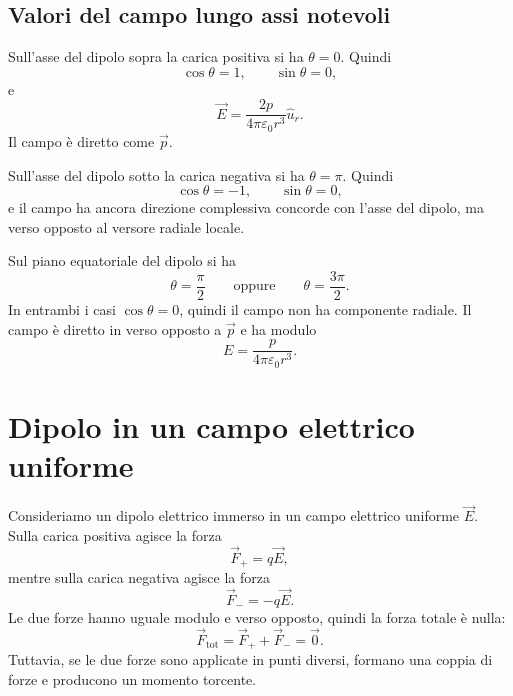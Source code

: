 \documentclass[a4paper]{article}
\begin{document}
\subsection{Valori del campo lungo assi notevoli}

Sull'asse del dipolo sopra la carica positiva si ha \(\theta=0\). Quindi
\[
    \cos\theta=1,
    \qquad
    \sin\theta=0,
\]
e
\[
    \vec{E}=\frac{2p}{4\pi\varepsilon_0r^3}\hat{u}_r.
\]
Il campo è diretto come \(\vec{p}\).

Sull'asse del dipolo sotto la carica negativa si ha \(\theta=\pi\). Quindi
\[
    \cos\theta=-1,
    \qquad
    \sin\theta=0,
\]
e il campo ha ancora direzione complessiva concorde con l'asse del dipolo, ma verso opposto al versore radiale locale.

Sul piano equatoriale del dipolo si ha
\[
    \theta=\frac{\pi}{2}
    \qquad\text{oppure}\qquad
    \theta=\frac{3\pi}{2}.
\]
In entrambi i casi \(\cos\theta=0\), quindi il campo non ha componente radiale. Il campo è diretto in verso opposto a \(\vec{p}\) e ha modulo
\[
    E=\frac{p}{4\pi\varepsilon_0r^3}.
\]

\section{Dipolo in un campo elettrico uniforme}

Consideriamo un dipolo elettrico immerso in un campo elettrico uniforme \(\vec{E}\). Sulla carica positiva agisce la forza
\[
    \vec{F}_+=q\vec{E},
\]
mentre sulla carica negativa agisce la forza
\[
    \vec{F}_-=-q\vec{E}.
\]
Le due forze hanno uguale modulo e verso opposto, quindi la forza totale è nulla:
\[
    \vec{F}_{\mathrm{tot}}=\vec{F}_++\vec{F}_-=\vec{0}.
\]
Tuttavia, se le due forze sono applicate in punti diversi, formano una coppia di forze e producono un momento torcente.

\begin{center}
\end{center}
\end{document}
